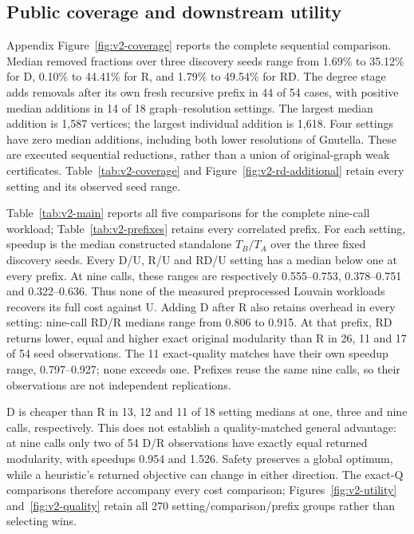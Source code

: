 \documentclass[sigconf,anonymous,review]{acmart}
\newcommand{\1}{\mathbf{1}}
\begin{document}
\subsection{Public coverage and downstream utility}
Appendix Figure~\ref{fig:v2-coverage} reports the complete sequential comparison.
Median removed fractions over three discovery seeds range from 1.69\% to 35.12\%
for D, 0.10\% to 44.41\% for R, and 1.79\% to 49.54\% for RD.
The degree stage adds removals after its own fresh recursive prefix in 44 of
54 cases, with positive median additions in 14 of 18 graph--resolution settings.
The largest median addition is 1,587 vertices; the largest individual addition
is 1,618. Four settings have zero median additions, including both lower
resolutions of Gnutella. These are executed sequential reductions, rather than
a union of original-graph weak certificates. Table~\ref{tab:v2-coverage} and
Figure~\ref{fig:v2-rd-additional} retain every setting and its observed seed range.



Table~\ref{tab:v2-main} reports all five comparisons for the complete nine-call
workload; Table~\ref{tab:v2-prefixes} retains every correlated prefix.
For each setting, speedup is the median constructed standalone $T_B/T_A$
over the three fixed discovery seeds. Every D/U, R/U and RD/U setting has a
median below one at every prefix. At nine calls, these ranges are respectively
0.555--0.753, 0.378--0.751 and 0.322--0.636. Thus none of the measured
preprocessed Louvain workloads recovers its full cost against U.
Adding D after R also retains overhead in every setting: nine-call RD/R
medians range from 0.806 to 0.915. At that prefix, RD returns lower, equal and
higher exact original modularity than R in 26, 11 and 17 of 54 seed observations.
The 11 exact-quality matches have their own speedup range, 0.797--0.927;
none exceeds one. Prefixes reuse the same nine calls, so their observations
are not independent replications.

D is cheaper than R in 13, 12 and 11 of 18 setting medians at one, three and
nine calls, respectively. This does not establish a quality-matched general
advantage: at nine calls only two of 54 D/R observations have exactly equal
returned modularity, with speedups 0.954 and 1.526.
Safety preserves a global optimum, while a heuristic's returned objective
can change in either direction. The exact-Q comparisons therefore accompany
every cost comparison; Figures~\ref{fig:v2-utility} and~\ref{fig:v2-quality}
retain all 270 setting/comparison/prefix groups rather than selecting wins.
\end{document}

